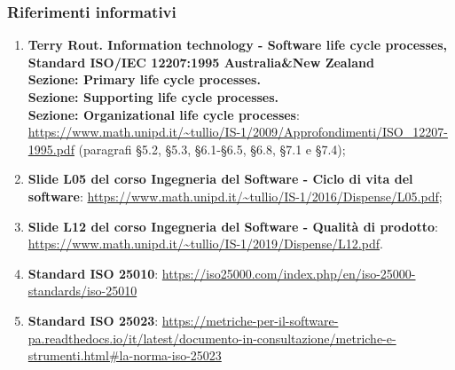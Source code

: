 \subsubsection{Riferimenti informativi}
\begin{enumerate}
	\item \textbf{Terry Rout. Information technology - Software life cycle processes, Standard ISO/IEC 12207:1995 Australia\&New Zealand \\ Sezione: Primary life cycle processes. \\ Sezione: Supporting life cycle processes. \\ Sezione: Organizational life cycle processes}: \url{https://www.math.unipd.it/~tullio/IS-1/2009/Approfondimenti/ISO_12207-1995.pdf} (paragrafi §5.2, §5.3, §6.1-§6.5, §6.8, §7.1 e §7.4);
	\item \textbf{Slide L05 del corso Ingegneria del Software - Ciclo di vita del software}: \url{https://www.math.unipd.it/~tullio/IS-1/2016/Dispense/L05.pdf};
	\item \textbf{Slide L12 del corso Ingegneria del Software - Qualità di prodotto}: \url{https://www.math.unipd.it/~tullio/IS-1/2019/Dispense/L12.pdf}.
	\item \textbf{Standard ISO 25010}:
	\url{https://iso25000.com/index.php/en/iso-25000-standards/iso-25010}
	\item \textbf{Standard ISO 25023}:
	\url{https://metriche-per-il-software-pa.readthedocs.io/it/latest/documento-in-consultazione/metriche-e-strumenti.html#la-norma-iso-25023}
	
	
	
	
	
	
\end{enumerate}


